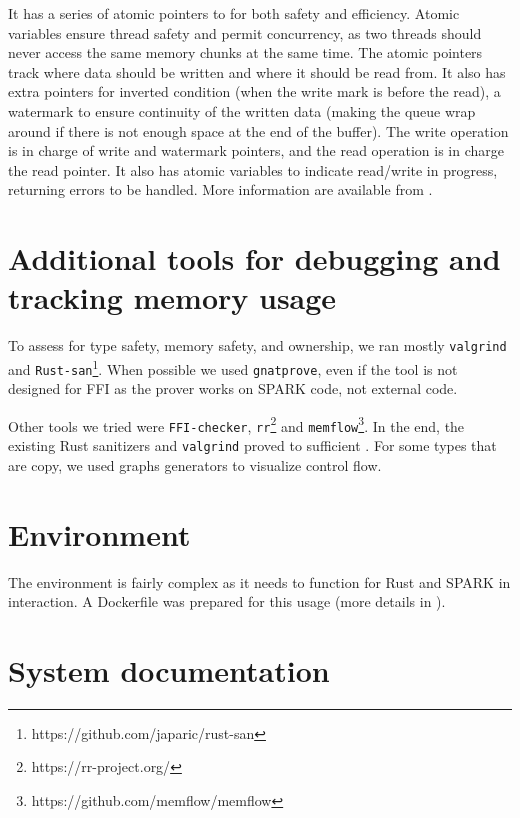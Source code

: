 \documentclass[nomenclature, english, bibtex]{kththesis}
\newcommand*{\generalExpl}[1]{\todo[inline]{#1}}
\newcommand*{\sweExpl}[1]{\todo[inline, backgroundcolor=kth-lightblue40]{#1}}  %
\begin{document}
It has a series of atomic pointers to for both safety and efficiency. Atomic variables ensure thread safety and permit concurrency, as two threads should never access the same memory chunks at the same time. The atomic pointers track where data should be written and where it should be read from. It also has extra pointers for inverted condition (when the write mark is before the read), a watermark to ensure continuity of the written data (making the queue wrap around if there is not enough space at the end of the buffer).  The write operation is in charge of write and watermark pointers, and the read operation is in charge the read pointer. It also has atomic variables to indicate read/write in progress, returning errors to be handled. More information are available from \cite{chouteau_rust_2021, munns_design_2019}.


\section{Additional tools for debugging and tracking memory usage}

To assess for type safety, memory safety, and ownership, we ran mostly \texttt{valgrind} and \texttt{Rust-san}\footnote{https://github.com/japaric/rust-san}.
When possible we used \texttt{gnatprove}, even if the tool is not designed for FFI as the prover works on SPARK code, not external code.

Other tools we tried were \texttt{FFI-checker}\cite{li_detecting_2022}, \texttt{rr}\footnote{https://rr-project.org/} and \texttt{memflow}\footnote{https://github.com/memflow/memflow}. In the end, the existing Rust sanitizers and \texttt{valgrind} proved to sufficient .
For some types that are copy, we used graphs generators to visualize control flow.


\section{Environment}

The environment is fairly complex as it needs to function for Rust and SPARK in interaction. A  Dockerfile was prepared for this usage (more details in ).


\section{System documentation}
\label{sec:systemDocumentation}
\end{document}
